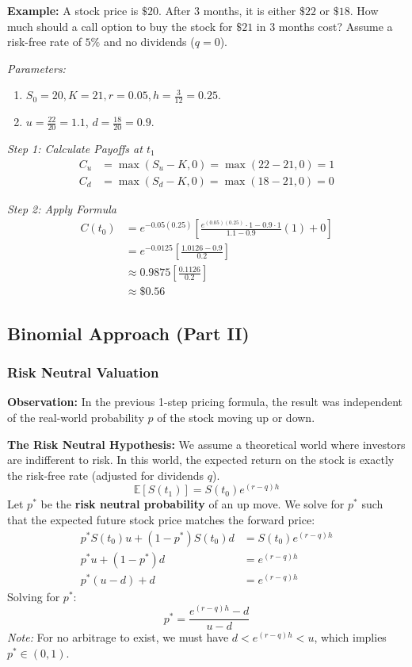 \textbf{Example:} A stock price is \(\$20\). After 3 months, it is either \(\$22\) or \(\$18\). How much should a call option to buy the stock for \(\$21\) in 3 months cost? Assume a risk-free rate of \(5\%\) and no dividends (\(q=0\)).

\textit{Parameters:}
\begin{enumerate}
    \item \(S_0 = 20, K = 21, r = 0.05, h = \frac{3}{12} = 0.25\).
    \item \(u = \frac{22}{20} = 1.1\), \(d = \frac{18}{20} = 0.9\).
\end{enumerate}

\textit{Step 1: Calculate Payoffs at \(t_1\)}
\begin{align*}
    C_u &= \max(S_u - K, 0) = \max(22 - 21, 0) = 1 \\
    C_d &= \max(S_d - K, 0) = \max(18 - 21, 0) = 0
\end{align*}

\textit{Step 2: Apply Formula}
\begin{align*}
    C(t_0) &= e^{-0.05(0.25)} \left[ \frac{e^{(0.05)(0.25)} \cdot 1 - 0.9 \cdot 1}{1.1 - 0.9}(1) + 0 \right] \\
    &= e^{-0.0125} \left[ \frac{1.0126 - 0.9}{0.2} \right] \\
    &\approx 0.9875 \left[ \frac{0.1126}{0.2} \right] \\
    &\approx \boxed{\$0.56}
\end{align*}

\subsection{Binomial Approach (Part II)}
\subsubsection{Risk Neutral Valuation}

\textbf{Observation:} In the previous 1-step pricing formula, the result was independent of the real-world probability $p$ of the stock moving up or down.

\textbf{The Risk Neutral Hypothesis:}
We assume a theoretical world where investors are indifferent to risk. In this world, the expected return on the stock is exactly the risk-free rate (adjusted for dividends $q$).
\begin{equation*}
    \mathbb{E}[S(t_1)] = S(t_0)e^{(r-q)h}
\end{equation*}
Let $p^*$ be the \textbf{risk neutral probability} of an up move. We solve for $p^*$ such that the expected future stock price matches the forward price:
\begin{align*}
    p^* S(t_0) u + (1-p^*) S(t_0) d &= S(t_0) e^{(r-q)h} \\
    p^* u + (1-p^*) d &= e^{(r-q)h} \\
    p^*(u-d) + d &= e^{(r-q)h}
\end{align*}
Solving for $p^*$:
\begin{equation*}
    \boxed{p^* = \frac{e^{(r-q)h} - d}{u - d}}
\end{equation*}
\textit{Note:} For no arbitrage to exist, we must have $d < e^{(r-q)h} < u$, which implies $p^* \in (0,1)$.

